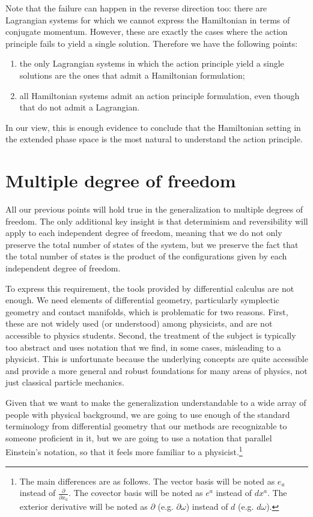 \documentclass[10pt,twocolumn, nofootinbib]{revtex4-2}
\begin{document}
Note that the failure can happen in the reverse direction too: there are Lagrangian systems for which we cannot express the Hamiltonian in terms of conjugate momentum. However, these are exactly the cases where the action principle fails to yield a single solution. Therefore we have the following points:
\begin{enumerate}
	\item the only Lagrangian systems in which the action principle yield a single solutions are the ones that admit a Hamiltonian formulation;
	\item all Hamiltonian systems admit an action principle formulation, even though that do not admit a Lagrangian.
\end{enumerate}

In our view, this is enough evidence to conclude that the Hamiltonian setting in the extended phase space is the most natural to understand the action principle.

\section{Multiple degree of freedom}

All our previous points will hold true in the generalization to multiple degrees of freedom. The only additional key insight is that determinism and reversibility will apply to each independent degree of freedom, meaning that we do not only preserve the total number of states of the system, but we preserve the fact that the total number of states is the product of the configurations given by each independent degree of freedom.

To express this requirement, the tools provided by differential calculus are not enough. We need elements of differential geometry, particularly symplectic geometry and contact manifolds, which is problematic for two reasons. First, these are not widely used (or understood) among physicists, and are not accessible to physics students. Second, the treatment of the subject is typically too abstract and uses notation that we find, in some cases, misleading to a physicist. This is unfortunate because the underlying concepts are quite accessible and provide a more general and robust foundations for many areas of physics, not just classical particle mechanics.

Given that we want to make the generalization understandable to a wide array of people with physical background, we are going to use enough of the standard terminology from differential geometry that our methods are recognizable to someone proficient in it, but we are going to use a notation that parallel Einstein's notation, so that it feels more familiar to a physicist.\footnote{The main differences are as follows. The vector basis will be noted as $e_a$ instead of $\frac{\partial}{\partial x_a}$. The covector basis will be noted as $e^a$ instead of $dx^a$. The exterior derivative will be noted as $\partial$ (e.g. $\partial \omega$) instead of $d$ (e.g. $d \omega$).}
\end{document}
